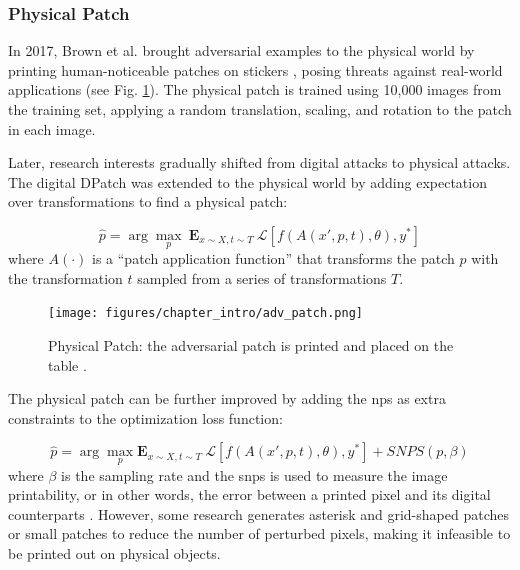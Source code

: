 



\subsubsection{Physical Patch}

In 2017, Brown et al. brought adversarial examples to the physical world by printing human-noticeable patches on stickers \citep{brown2017patch}, posing threats against real-world applications (see Fig. \ref{fig.physical_patch}). The physical patch is trained using 10,000 images from the training set, applying a random translation, scaling, and rotation to the patch in each image.

Later, research interests gradually shifted from digital attacks to physical attacks. The digital DPatch \citep{liu2018dpatch} was extended to the physical world \citep{lee2019physical} by adding expectation over transformations to find a physical patch:

\begin{equation}
\hat{p} = \arg \underset{p}{\max}\ \mathbf{E}_{x \sim X, t \sim T}\ \mathcal{L}[f(A(x', p, t), \theta), y^*]
\end{equation}
where $A(\cdot)$ is a “patch application function” that transforms the patch
$p$ with the transformation $t$ sampled from a series of transformations $T$.

\begin{figure}[H]
\centering
\texttt{[image: figures/chapter\_intro/adv\_patch.png]}
\caption{Physical Patch: the adversarial patch is printed and placed on the table \citep{brown2017patch}.}
\label{fig.physical_patch}
\end{figure}

The physical patch can be further improved by adding the \acrfull{nps} as extra constraints to the optimization loss function:

\begin{equation}
\hat{p} = \arg \underset{p}{\max}\mathbf{E}_{x \sim X, t \sim T}\ \mathcal{L}[f(A(x', p, t), \theta), y^*] + SNPS(p, \beta)
\end{equation}
where $\beta$ is the sampling rate and the \acrfull{snps} is used to measure the image printability, or in other words, the error between a printed pixel and its digital counterparts \citep{wang2021daedalus}. However, some research generates asterisk and grid-shaped patches \citep{wu2020dpattack} or small patches \citep{huang2021rpattack} to reduce the number of perturbed pixels, making it infeasible to be printed out on physical objects.

